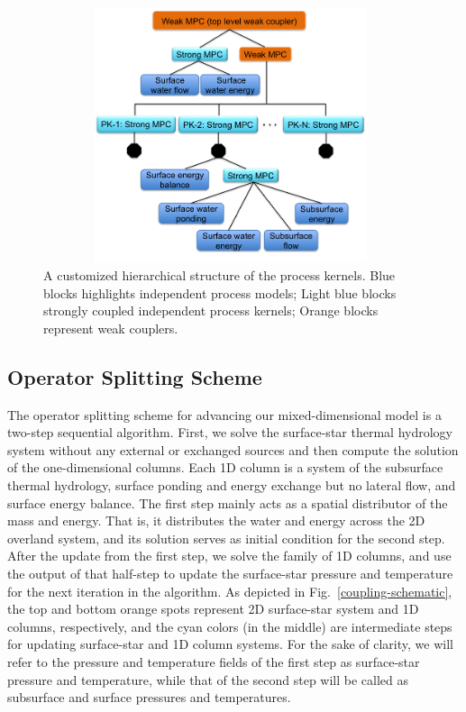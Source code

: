 \documentclass[review]{elsarticle}
\begin{document}
\begin{figure}[!htpb]
\centering
\includegraphics[height = 7.5cm, width=11cm]{figures/process-tree1.png}
\caption{A customized hierarchical structure of the process kernels. Blue blocks highlights independent process models; Light blue blocks strongly coupled independent process kernels; Orange blocks represent weak couplers.}
\label{pk-tree}
\end{figure}


\subsection{Operator Splitting Scheme}
The operator splitting scheme for advancing our mixed-dimensional model is a two-step sequential algorithm. First, we solve the surface-star thermal hydrology system without any external or exchanged sources and then compute the solution of the one-dimensional columns. Each 1D column is a system of the subsurface thermal hydrology, surface ponding and energy exchange but no lateral flow, and surface energy balance. The first step mainly acts as a spatial distributor of the mass and energy. That is, it distributes the water and energy across the 2D overland system, and its solution serves as initial condition for the second step. After the update from the first step, we solve the family of 1D columns, and use the output of that half-step to update the surface-star pressure and temperature for the next iteration in the algorithm. As depicted in Fig.~\ref{coupling-schematic}, the top and bottom orange spots represent 2D surface-star system and 1D columns, respectively, and the cyan colors (in the middle) are intermediate steps for updating surface-star and 1D column systems. For the sake of clarity, we will refer to the pressure and temperature fields of the first step as surface-star pressure and temperature, while that of the second step will be called as subsurface and surface pressures and temperatures.
\end{document}
